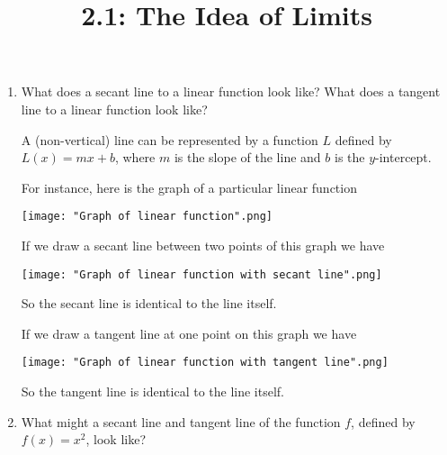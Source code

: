 \documentclass[nooutcomes]{ximera}
\title{2.1:  The Idea of Limits}
\begin{document}
\begin{abstract}		\end{abstract}
\maketitle


 \begin{problem} \hfil

	\begin{enumerate}

		\item What does a secant line to a linear function look like?  What does a tangent line to a linear function look like? 

 \begin{freeResponse}		 
	
	A (non-vertical) line can be represented by a function $L$ defined by $L(x) = mx + b$, where $m$ is the slope of the line and $b$ is the $y$-intercept.
      
        For instance, here is the graph of a particular linear function
        \begin{image}
          \texttt{[image: "Graph of linear function".png]}
        \end{image}

        If we draw a secant line between two points of this graph we have
        \begin{image}
          \texttt{[image: "Graph of linear function with secant line".png]}
        \end{image}
        So the secant line is identical to the line itself.

        If we draw a tangent line at one point on this graph we have
        \begin{image}
          \texttt{[image: "Graph of linear function with tangent line".png]}
        \end{image}
        So the tangent line is identical to the line itself.
\end{freeResponse}


		\item  What might a secant line and tangent line of the function $f$, defined by $f(x) = x^2$, look like?


\end{enumerate}
\end{problem}
\end{document}
